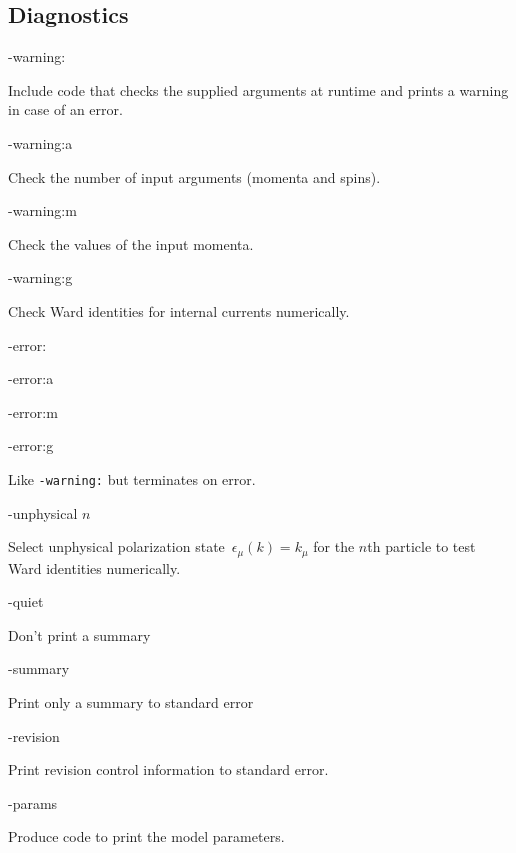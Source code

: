 \documentclass[12pt,a4paper]{article}
\newenvironment{options}%
 {\begin{list}{}%
   {\setlength{\leftmargin}{3em}%
    \setlength{\rightmargin}{3em}%
    \setlength{\itemindent}{1em}%
    \setlength{\listparindent}{0pt}%
    \settowidth{\labelwidth}{5em}%
    \renewcommand{\makelabel}[1]{\texttt{##1}}}}%
 {\end{list}}
\begin{document}
\subsection{Diagnostics}
\begin{options}
  \item[-warning:]\hfil\par
    Include code that checks the supplied arguments at runtime and
    prints a warning in case of an error.
  \item[-warning:a]\hfil\par
    Check the number of input arguments (momenta and spins).
  \item[-warning:m]\hfil\par
    Check the values of the input momenta.
  \item[-warning:g]\hfil\par
    Check Ward identities for internal currents numerically.
  \item[-error:]
  \item[-error:a]
  \item[-error:m]
  \item[-error:g]\hfil\par
    Like \verb+-warning:+ but terminates on error.
  \item[-unphysical] $n$\par
    Select unphysical polarization state~$\epsilon_\mu(k)=k_\mu$ for
    the $n$th particle to test Ward identities numerically.
  \item[-quiet]\hfil\par
    Don't print a summary
  \item[-summary]\hfil\par
    Print only a summary to standard error
  \item[-revision]\hfil\par
    Print revision control information to standard error.
  \item[-params]\hfil\par
    Produce code to print the model parameters.
\end{options}
\end{document}
